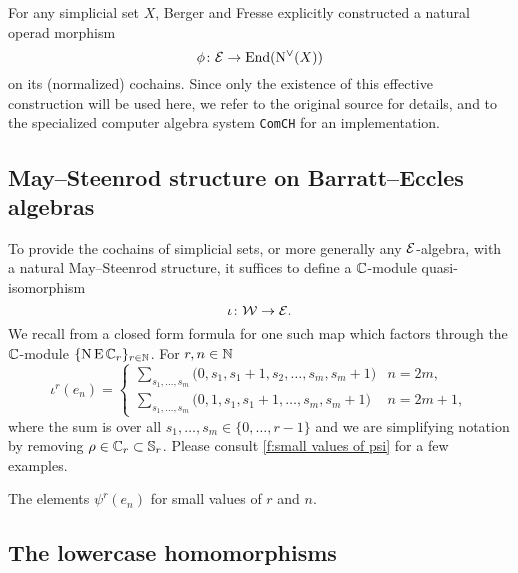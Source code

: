For any simplicial set $X$, Berger and Fresse explicitly constructed a natural operad morphism
\[
\phi \colon \mathcal{E} \to \mathrm{End}(\operatorname{N^{\vee}}(X))
\]
on its (normalized) cochains.
Since only the existence of this effective construction will be used here, we refer to the original source for details, and to the specialized computer algebra system \texttt{ComCH} for an implementation.

\subsection{May--Steenrod structure on Barratt--Eccles algebras}

To provide the cochains of simplicial sets, or more generally any $\mathcal{E}$-algebra, with a natural May--Steenrod structure, it suffices to define a $\mathbb{C}$-module quasi-isomorphism
\[
\iota \colon \mathcal{W} \to \mathcal{E}.
\]
We recall from \cite{medina2021may_st} a closed form formula for one such map which factors through the $\mathbb{C}$-module $\{\operatorname{N}\operatorname{E}\mathbb{C}_r\}_{r\in\mathbb{N}}$.
For $r,n\in\mathbb{N}$
\begin{equation*}
	\iota^{r}(e_{n}) = \begin{cases}
		\displaystyle{\sum_{s_1, \dots, s_m}} \big(0, {s_1}, {s_1+1}, {s_2}, \dots, {s_{m}}, {s_{m}+1} \big) & n = 2m, \\
		\displaystyle{\sum_{s_1, \dots, s_m}} \big(0, 1, {s_1}, {s_1+1}, \dots, {s_{m}}, {s_{m}+1} \big) & n = 2m+1,
	\end{cases}
\end{equation*}
where the sum is over all $s_1, \dots, s_m \in \{0, \dots, r-1\}$ and we are simplifying notation by removing $\rho \in \mathbb{C}_r \subset \mathbb{S}_r$.
Please consult \cref{f:small values of psi} for a few examples.

\begin{table}
	\centering
	
	\caption{The elements $\psi^r(e_n)$ for small values of $r$ and $n$.}
	\label{f:small values of psi}
\end{table}

\subsection{The lowercase homomorphisms}

